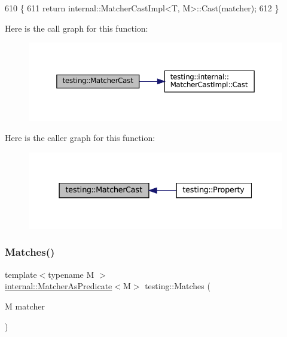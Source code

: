 \begin{DoxyCode}
610                                                 \{
611   \textcolor{keywordflow}{return} internal::MatcherCastImpl<T, M>::Cast(matcher);
612 \}
\end{DoxyCode}
Here is the call graph for this function\+:
\nopagebreak
\begin{figure}[H]
\begin{center}
\leavevmode
\includegraphics[width=350pt]{namespacetesting_a8234d15eee99b135a7fdf2141a2ebe1f_cgraph}
\end{center}
\end{figure}
Here is the caller graph for this function\+:
\nopagebreak
\begin{figure}[H]
\begin{center}
\leavevmode
\includegraphics[width=331pt]{namespacetesting_a8234d15eee99b135a7fdf2141a2ebe1f_icgraph}
\end{center}
\end{figure}
\mbox{\label{namespacetesting_ad53b509ae9cd51040d67f668f99702ae}} 
\subsubsection{\texorpdfstring{Matches()}{Matches()}}
{\footnotesize\ttfamily template$<$typename M $>$ \\
\hyperlink{classtesting_1_1internal_1_1MatcherAsPredicate}{internal\+::\+Matcher\+As\+Predicate}$<$M$>$ testing\+::\+Matches (\begin{DoxyParamCaption}\item[{M}]{matcher }\end{DoxyParamCaption})\hspace{0.3cm}{\ttfamily [inline]}}



